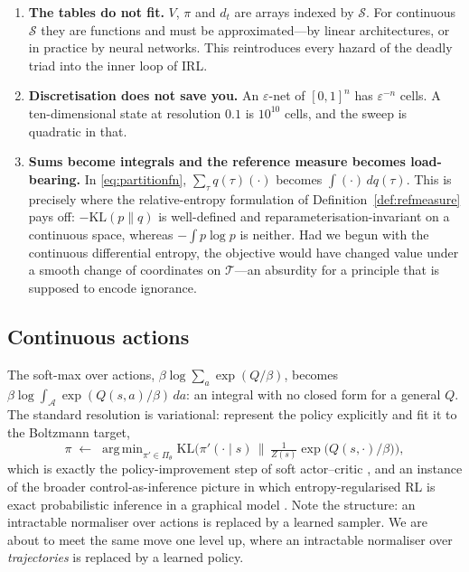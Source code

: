 \documentclass[11pt]{article}
\theoremstyle{plain}
\theoremstyle{definition}
\theoremstyle{remark}
\renewcommand{\S}{\mathcal{S}}
\newcommand{\A}{\mathcal{A}}
\newcommand{\T}{\mathcal{T}}
\newcommand{\KL}{\mathrm{KL}}
\DeclareMathOperator*{\argmin}{arg\,min}
\begin{document}
\begin{enumerate}
\item \textbf{The tables do not fit.} $V$, $\pi$ and $d_t$ are arrays
indexed by $\S$. For continuous $\S$ they are functions and must be
approximated---by linear architectures, or in practice by neural
networks. This reintroduces every hazard of the deadly triad into the
inner loop of IRL.
\item \textbf{Discretisation does not save you.} An $\varepsilon$-net of
$[0,1]^n$ has $\varepsilon^{-n}$ cells. A ten-dimensional state at
resolution $0.1$ is $10^{10}$ cells, and the sweep is quadratic in that.
\item \textbf{Sums become integrals and the reference measure becomes
load-bearing.} In \eqref{eq:partitionfn}, $\sum_\tau q(\tau)(\cdot)$
becomes $\int(\cdot)\,dq(\tau)$. This is precisely where the
relative-entropy formulation of Definition~\ref{def:refmeasure} pays off:
$-\KL(p\|q)$ is well-defined and reparameterisation-invariant on a
continuous space, whereas $-\int p\log p$ is neither. Had we begun with
the continuous differential entropy, the objective would have changed
value under a smooth change of coordinates on $\T$---an absurdity for a
principle that is supposed to encode ignorance.
\end{enumerate}

\subsection{Continuous actions}

The soft-max over actions, $\beta\log\sum_a\exp(Q/\beta)$, becomes
$\beta\log\int_\A \exp(Q(s,a)/\beta)\,da$: an integral with no closed form
for a general $Q$. The standard resolution is variational: represent the
policy explicitly and fit it to the Boltzmann target,
\begin{equation}
\pi \;\leftarrow\; \argmin_{\pi'\in\Pi_\theta} \KL\Big(\pi'(\cdot\mid s)\,\Big\|\,
\tfrac1{Z(s)}\exp\big(Q(s,\cdot)/\beta\big)\Big),
\label{eq:sacstep}
\end{equation}
which is exactly the policy-improvement step of soft actor--critic
\cite{haarnoja2018}, and an instance of the broader control-as-inference
picture in which entropy-regularised RL is exact probabilistic inference
in a graphical model \cite{levine2018tutorial}. Note the structure: an
intractable normaliser over actions is replaced by a learned sampler. We
are about to meet the same move one level up, where an intractable
normaliser over \emph{trajectories} is replaced by a learned policy.
\end{document}
